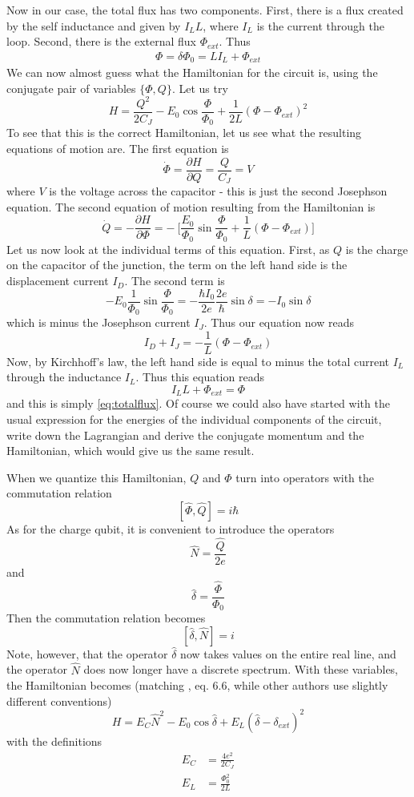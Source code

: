 \documentclass[a4paper, draft]{article}
\theoremstyle{own}
\theoremstyle{remark}
\begin{document}
Now in our case, the total flux has two components. First, there is a flux created by the self inductance and given by $I_L L$, where $I_L$ is the current through the loop. Second, there is the external flux $\Phi_{ext}$. Thus
\begin{align}
\label{eq:totalflux}
\Phi = \delta \Phi_0 = L I_L + \Phi_{ext}
\end{align}
We can now almost guess what the Hamiltonian for the circuit is, using the conjugate pair of variables $\{\Phi, Q\}$. Let us try 
$$
H = \frac{Q^2}{2C_J} - E_0 \cos \frac{\Phi}{\Phi_0} + \frac{1}{2L}( \Phi  - \Phi_{ext})^2
$$
To see that this is the correct Hamiltonian, let us see what the resulting equations of motion are. The first equation is
$$
\dot{\Phi} = \frac{\partial H }{\partial Q} = \frac{Q}{C_J} = V
$$
where $V$ is the voltage across the capacitor - this is just the second Josephson equation. The second equation of motion resulting from the Hamiltonian is 
$$
\dot{Q} = - \frac{\partial H}{\partial \Phi} = - \
\big[ 
\frac{E_0}{\Phi_0} \sin \frac{\Phi}{\Phi_0} + \frac{1}{L} (\Phi - \Phi_{ext})
\big] 
$$
Let us now look at the individual terms of this equation. First, as $Q$ is the charge on the capacitor of the junction, the term on the left hand side is the displacement current $I_D$. The second term is
$$
- E_0 \frac{1}{\Phi_0} \sin \frac{\Phi}{\Phi_0} =  - \frac{\hbar I_0}{2e} \frac{2e}{\hbar} \sin{\delta} = - I_0 \sin \delta
$$
which is minus the Josephson current $I_J$. Thus our equation now reads
$$
I_D  + I_J =  - \frac{1}{L} (\Phi - \Phi_{ext})
$$
Now, by Kirchhoff's law, the left hand side is equal to minus the total current $I_L$ through the inductance $I_L$. Thus this equation reads
$$
 I_L L + \Phi_{ext} = \Phi
$$
and this is simply \eqref{eq:totalflux}. Of course we could also have started with the usual expression for the energies of the individual components of the circuit, write down the Lagrangian and derive the conjugate momentum and the Hamiltonian, which would give us the same result.

When we quantize this Hamiltonian, $Q$ and $\Phi$ turn into operators with the commutation relation
$$
[\hat{\Phi}, \hat{Q}] = i \hbar
$$
As for the charge qubit, it is convenient to introduce the operators
$$
\hat{N} = \frac{\hat{Q}}{2e}
$$
and 
$$
\hat{\delta} = \frac{\hat{\Phi}}{\Phi_0}
$$
Then the commutation relation becomes
$$
[ \hat{\delta}, \hat{N}  ] =  i 
$$
Note, however, that the operator $\hat{\delta}$ now takes values on the entire real line, and the operator $\hat{N}$ does now longer have a discrete spectrum. With these variables, the Hamiltonian becomes (matching \cite{WendinShumeiko}, eq. 6.6, while other authors use slightly different conventions)
$$
H =  E_C \hat{N}^2 - E_0 \cos \hat{\delta} + E_L ( \hat{\delta}  - \delta_{ext})^2
$$
with the definitions
\begin{align*}
E_C &= \frac{4e^2}{2C_J}  \\
E_L &= \frac{\Phi_0^2}{2L}
\end{align*}
\end{document}
